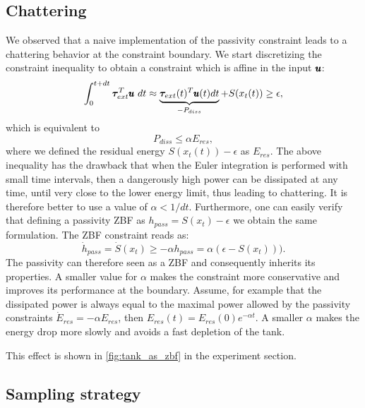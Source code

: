 \subsection{Chattering}
We observed that a naive implementation of the passivity constraint leads to a chattering behavior at the constraint boundary. We start discretizing the constraint inequality to obtain a constraint which is affine in the input $\pmb{u}$:
\begin{equation*}
    \int_{0}^{t + dt} \boldsymbol{\tau}_{ext}^T \pmb{u} \ dt \approx \underbrace{\boldsymbol{\tau}_{ext}(t)^T \pmb{u}(t) dt}_{-P_{diss}} + S(x_t(t)) \geq \epsilon,
\end{equation*}
which is equivalent to 
\begin{equation} \label{eq:passivity_simple}
    P_{diss} \leq \alpha E_{res},
\end{equation}
where we defined the residual energy $S(x_t(t))-\epsilon$ as $E_{res}$. The above inequality has the drawback that when the Euler integration is performed with small time intervals, then a dangerously high power can be dissipated at any time, until very close to the lower energy limit, thus leading to chattering. It is therefore better to use a value of $\alpha < 1/dt$. Furthermore, one can easily verify that defining a passivity ZBF as $h_{pass} = S(x_t) - \epsilon$ we obtain the same formulation. The ZBF constraint reads as:
\begin{equation*}
    \dot{h}_{pass} = \dot{S}(x_t) \geq -\alpha h_{pass}
     =\alpha (\epsilon - S(x_t))).
\end{equation*}
The passivity can therefore seen as a ZBF and consequently inherits its properties. A smaller value for $\alpha$ makes the constraint more conservative and improves its performance at the boundary. Assume, for example that the dissipated power is always equal to the maximal power allowed by the passivity constraints $\dot{E}_{res} = - \alpha E_{res}$, then $E_{res}(t) = E_{res}(0) e^{-\alpha t}$. A smaller $\alpha$ makes the energy drop more slowly and avoids a fast depletion of the tank.


This effect is shown in \fig \ref{fig:tank_as_zbf} in the experiment section.

\subsection{Sampling strategy}

